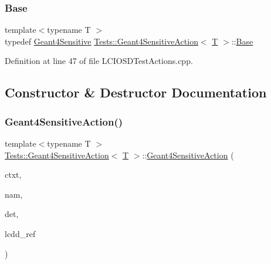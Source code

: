 \subsubsection{\texorpdfstring{Base}{Base}}
{\footnotesize\ttfamily template$<$typename T $>$ \\
typedef \hyperlink{class_d_d4hep_1_1_simulation_1_1_geant4_sensitive}{Geant4\+Sensitive} \hyperlink{class_tests_1_1_geant4_sensitive_action}{Tests\+::\+Geant4\+Sensitive\+Action}$<$ \hyperlink{class_t}{T} $>$\+::\hyperlink{class_tests_1_1_geant4_sensitive_action_afb2235077e4e86f00859155e5379bbad}{Base}\hspace{0.3cm}{\ttfamily [protected]}}



Definition at line 47 of file L\+C\+I\+O\+S\+D\+Test\+Actions.\+cpp.



\subsection{Constructor \& Destructor Documentation}
\hypertarget{class_tests_1_1_geant4_sensitive_action_a0ed0ce7ae78a2d675419e5a1241b7570}{}\label{class_tests_1_1_geant4_sensitive_action_a0ed0ce7ae78a2d675419e5a1241b7570} 
\subsubsection{\texorpdfstring{Geant4\+Sensitive\+Action()}{Geant4SensitiveAction()}}
{\footnotesize\ttfamily template$<$typename T $>$ \\
\hyperlink{class_tests_1_1_geant4_sensitive_action}{Tests\+::\+Geant4\+Sensitive\+Action}$<$ \hyperlink{class_t}{T} $>$\+::\hyperlink{class_tests_1_1_geant4_sensitive_action}{Geant4\+Sensitive\+Action} (\begin{DoxyParamCaption}\item[{\hyperlink{class_d_d4hep_1_1_simulation_1_1_geant4_context}{Geant4\+Context} $\ast$}]{ctxt,  }\item[{const std\+::string \&}]{nam,  }\item[{\hyperlink{class_d_d4hep_1_1_simulation_1_1_geant4_sensitive_a1cb1af5fb1194be1e1c1137f1e54272b}{Det\+Element}}]{det,  }\item[{\hyperlink{class_d_d4hep_1_1_simulation_1_1_geant4_sensitive_a3373caa6917867ca7c871df20fb467c8}{L\+C\+DD} \&}]{lcdd\+\_\+ref }\end{DoxyParamCaption})\hspace{0.3cm}{\ttfamily [inline]}}



